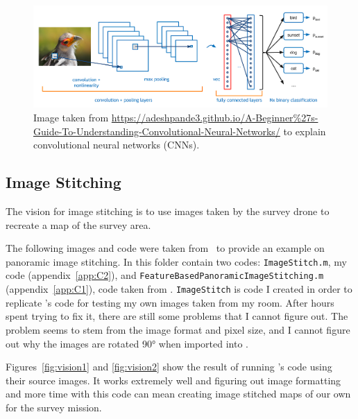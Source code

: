\begin{figure}
\begin{center}
\includegraphics[width=\columnwidth]{figures/vision1.png}
\end{center}
\caption{Image taken from \url{https://adeshpande3.github.io/A-Beginner\%27s-Guide-To-Understanding-Convolutional-Neural-Networks/} to explain convolutional neural networks (CNNs).}
\end{figure}

\subsection{Image Stitching}
The vision for image stitching is to use images taken by the survey drone to recreate a map of the survey area. 


The following images and code were taken from \Matlab\ to provide an example on panoramic image stitching. In this folder contain two codes: \lstinline{ImageStitch.m}, my code (appendix~\ref{app:C2}), and \lstinline{FeatureBasedPanoramicImageStitching.m} (appendix~\ref{app:C1}), code taken from \Matlab. \lstinline{ImageStitch} is code I created in order to replicate \Matlab’s code for testing my own images taken from my room. After hours spent trying to fix it, there are still some problems that I cannot figure out. The problem seems to stem from the image format and pixel size, and I cannot figure out why the images are rotated \ang{90} when imported into \Matlab.

Figures~\ref{fig:vision1} and \ref{fig:vision2} show the result of running \Matlab’s code using their source images. It works extremely well and figuring out image formatting and more time with this code can mean creating image stitched maps of our own for the survey mission.
  
